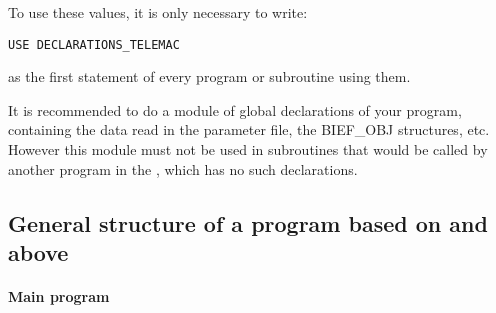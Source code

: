 To use these values, it is only necessary to write:
\begin{lstlisting}[language=TelFortran]
USE DECLARATIONS_TELEMAC
\end{lstlisting}
as the first statement of every program or subroutine using them.

It is recommended to do a module of global declarations of your program,
containing the data read in the parameter file, the BIEF\_OBJ structures, etc.
However this module must not be used in subroutines that would be called by
another program in the \telemacsystem, which has no such declarations.

\subsection{General structure of a program based on  and above}

\paragraph{Main program}

